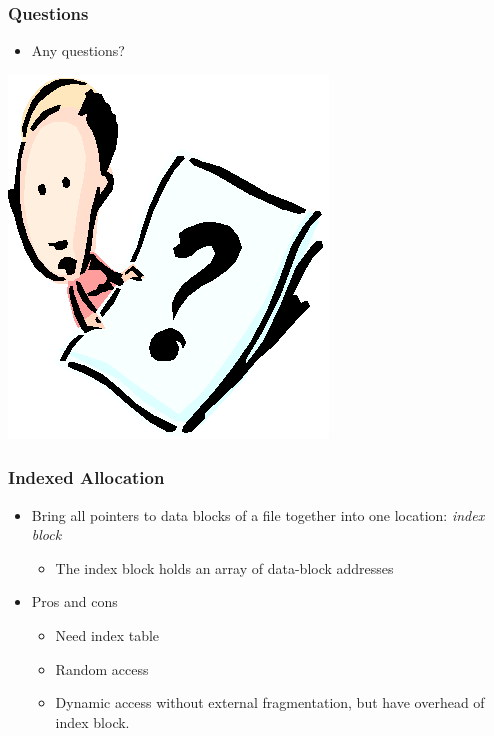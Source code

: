 \documentclass[CJKutf8,xcolor=pdftex,dvipsnames,table]{beamer}
\begin{document}
\begin{CJK*}{UTF8}{song}
  \begin{frame}
    \frametitle{Questions}
    \begin{itemize}
    \item Any questions?
    \end{itemize}
    \begin{center}
      \includegraphics[scale=.5]{question}
    \end{center}
  \end{frame}
  
  \begin{frame}
    \frametitle{Indexed Allocation} \pause
    \begin{itemize}\parskip=0pt
    \item Bring all pointers to data blocks of a file together into one location: \emph{index block} \pause
      \begin{itemize}\parskip=0pt
      \item The index block holds an array of data-block addresses \pause
      \end{itemize}
    \item Pros and cons \pause
      \begin{itemize}\parskip=0pt
      \item Need index table \pause
      \item Random access \pause
      \item Dynamic access without external fragmentation, but have overhead of index block.
      \end{itemize}
    \end{itemize}
  \end{frame}
  

\end{CJK*}
\end{document}
